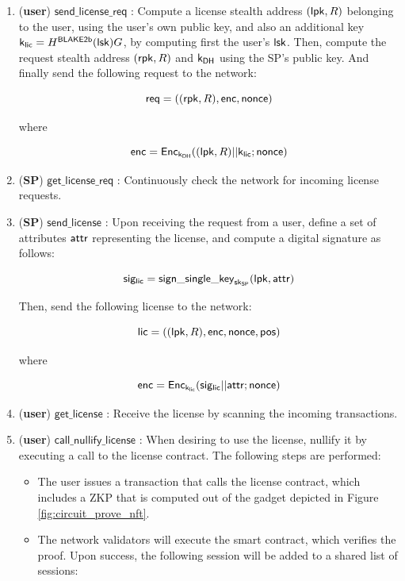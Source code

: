 \begin{enumerate}
	\item (\textbf{user}) $\mathsf{send\_license\_req}$ : Compute a license stealth address $(\mathsf{lpk}, R)$ belonging to the user, using the user's own public key, and also an additional key $\mathsf{k}_{\mathsf{lic}} = H^\mathsf{BLAKE2b}(\mathsf{lsk})G$, by computing first the user's $\mathsf{lsk}$. Then, compute the request stealth address $(\mathsf{rpk}, R)$ and $\mathsf{k_{DH}}$ using the SP's public key. And finally send the following request to the network:


		$$\mathsf{req} = ((\mathsf{rpk}, R), \mathsf{enc}, \mathsf{nonce})$$

	where 

		$$\mathsf{enc} = \mathsf{Enc}_{\mathsf{k_{DH}}} ((\mathsf{lpk}, R)||\mathsf{k}_{\mathsf{lic}}; \mathsf{nonce})$$


	\item (\textbf{SP}) $\mathsf{get\_license\_req}$ : Continuously check the network for incoming license requests.

	\item (\textbf{SP}) $\mathsf{send\_license}$ : Upon receiving the request from a user, define a set of attributes $\mathsf{attr}$ representing the license, and compute a digital signature as follows:

		$$\mathsf{sig_{lic}} = \mathsf{sign\_single\_key}_{\mathsf{sk}_{\mathsf{SP}}}(\mathsf{lpk}, \mathsf{attr})$$

	Then, send the following license to the network:

		$$\mathsf{lic} = ((\mathsf{lpk}, R), \mathsf{enc}, \mathsf{nonce}, \mathsf{pos})$$

	where 

		$$\mathsf{enc} = \mathsf{Enc}_{\mathsf{k}_{\mathsf{lic}}} (\mathsf{sig_{lic}} || \mathsf{attr}; \mathsf{nonce})$$

	\item (\textbf{user}) $\mathsf{get\_license}$ : Receive the license by scanning the incoming transactions.

	\item (\textbf{user}) $\mathsf{call\_nullify\_license}$ : When desiring to use the license, nullify it by executing a call to the license contract. The following steps are performed:

	\begin{itemize}
		\item The user issues a transaction that calls the license contract, which includes a ZKP that is computed out of the gadget depicted in Figure \ref{fig:circuit_prove_nft}.
		\item The network validators will execute the smart contract, which verifies the proof. Upon success, the following session will be added to a shared list of sessions:


\end{itemize}
\end{enumerate}

